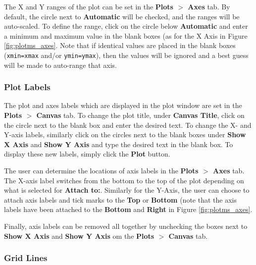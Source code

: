 The X and Y ranges of the plot can be set in the {\bf Plots $>$ Axes} tab. By default, the circle next to {\bf Automatic} will be checked, and the ranges will be auto-scaled. To define the range, click on the circle below {\bf Automatic} and enter a minimum and maximum value in the blank boxes (as for the X Axis in Figure \ref{fig:plotms_axes}. Note that if identical values are placed in the blank boxes ({\tt xmin=xmax} and/or {\tt ymin=ymax}), then the values will be ignored and a best guess will be made to auto-range that axis.


\subsubsection{Plot Labels}
\label{section:edit.plot.plotms.labels}

The plot and axes labels which are displayed in the plot window are
set in the {\bf Plots $>$ Canvas} tab. To change the plot title, under
{\bf Canvas Title}, click on the circle next to the blank box and
enter the desired text. 
To change the X- and Y-axis labels, similarly click on the circles next to the blank boxes under {\bf Show X Axis} and {\bf Show Y Axis} and type the desired text in the blank box. To display these new labels, simply click the {\bf Plot} button.

The user can determine the locations of axis labels in the {\bf Plots $>$ Axes} tab. The X-axis label switches from the bottom to the top of the plot depending on what is selected for {\bf Attach to:}. Similarly for the Y-Axis, the user can choose to attach axis labels and tick marks to the {\bf Top} or {\bf Bottom} (note that the axis labels have been attached to the {\bf Bottom} and {\bf Right} in Figure \ref{fig:plotms_axes}.

Finally, axis labels can be removed all together by unchecking the boxes next to {\bf Show X Axis} and {\bf Show Y Axis} om the {\bf Plots $>$ Canvas} tab.


\subsubsection{Grid Lines}
\label{section:edit.plot.plotms.grid}

